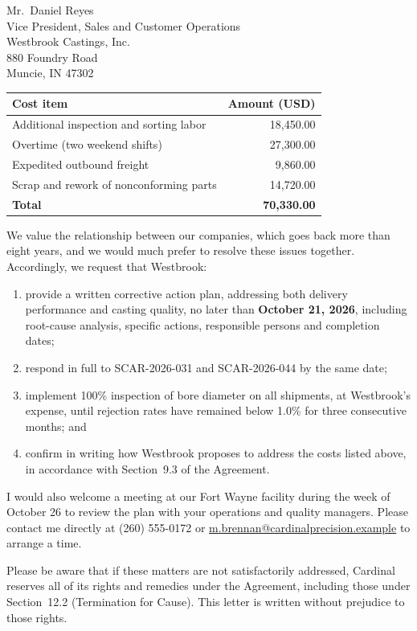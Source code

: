 \documentclass[11pt]{letter}
\begin{document}
\begin{letter}{Mr.\ Daniel Reyes\\
               Vice President, Sales and Customer Operations\\
               Westbrook Castings, Inc.\\
               880 Foundry Road\\
               Muncie, IN 47302}
\begin{center}
\begin{tabular}{@{}lr@{}}
  \toprule
  Cost item & Amount (USD) \\
  \midrule
  Additional inspection and sorting labor & 18,450.00 \\
  Overtime (two weekend shifts)           & 27,300.00 \\
  Expedited outbound freight              & 9,860.00 \\
  Scrap and rework of nonconforming parts & 14,720.00 \\
  \midrule
  \textbf{Total}                          & \textbf{70,330.00} \\
  \bottomrule
\end{tabular}
\end{center}

We value the relationship between our companies, which goes back more than eight years, and we would much prefer to resolve these issues together. Accordingly, we request that Westbrook:

\begin{enumerate}[label=(\alph*), leftmargin=*, itemsep=2pt]
  \item provide a written corrective action plan, addressing both delivery performance and casting quality, no later than \textbf{October 21, 2026}, including root-cause analysis, specific actions, responsible persons and completion dates;
  \item respond in full to SCAR-2026-031 and SCAR-2026-044 by the same date;
  \item implement 100\% inspection of bore diameter on all shipments, at Westbrook's expense, until rejection rates have remained below 1.0\% for three consecutive months; and
  \item confirm in writing how Westbrook proposes to address the costs listed above, in accordance with Section~9.3 of the Agreement.
\end{enumerate}

I would also welcome a meeting at our Fort Wayne facility during the week of October 26 to review the plan with your operations and quality managers. Please contact me directly at (260) 555-0172 or \href{mailto:m.brennan@cardinalprecision.example}{m.brennan@cardinalprecision.example} to arrange a time.

Please be aware that if these matters are not satisfactorily addressed, Cardinal reserves all of its rights and remedies under the Agreement, including those under Section~12.2 (Termination for Cause). This letter is written without prejudice to those rights.


\end{letter}
\end{document}
